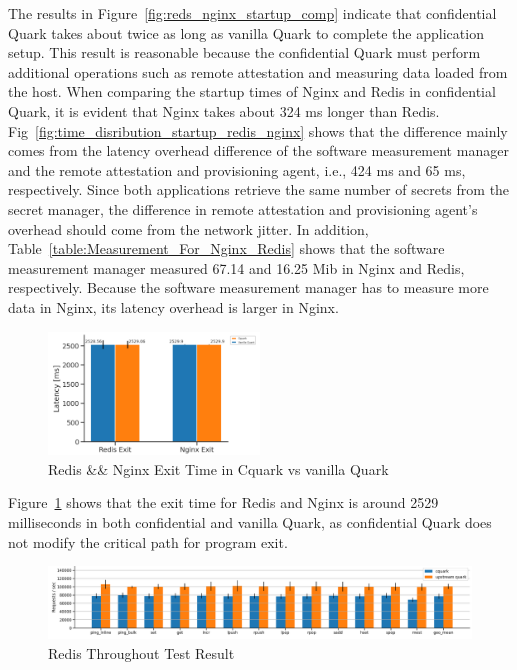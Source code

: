 The results in Figure~\ref{fig:reds_nginx_startup_comp} indicate that confidential Quark takes about twice as long as vanilla Quark to complete the application setup. This result is reasonable because the confidential Quark must perform additional operations such as remote attestation and 
measuring data loaded from the host. When comparing the startup times of Nginx and Redis in confidential Quark, it is evident that Nginx takes about 324 ms longer than Redis. Fig~\ref{fig:time_disribution_startup_redis_nginx} shows that the difference mainly comes from the latency overhead 
difference of the software measurement manager and the remote attestation and provisioning agent, i.e., 424 ms and 65 ms, respectively. Since both applications retrieve the same number of secrets from the secret manager, the difference in remote attestation and provisioning 
agent's overhead should come from the network jitter. In addition, Table~\ref{table:Measurement_For_Nginx_Redis} shows that the software measurement manager measured 67.14 and 16.25 Mib in Nginx and Redis, respectively. Because the software measurement manager has to measure more data in 
Nginx, its latency overhead is larger in Nginx. 

\begin{figure}[!htb]
  \centering
  \includegraphics[width=0.5\textwidth]{images/reds_nginx_exit_comp.PNG}
  \caption[Redis \&\& Nginx Exit Time in Cquark vs vanilla Quark]{Redis \&\& Nginx Exit Time in Cquark vs vanilla Quark}
  \label{fig:reds_nginx_exit_comp}
\end{figure}
Figure~\ref{fig:reds_nginx_exit_comp} shows that the exit time for Redis and Nginx is around 2529 milliseconds in both confidential and vanilla Quark, as confidential Quark does not modify the critical path for program exit.
\begin{figure}[!htb]
  \centering
  \includegraphics[width=1\textwidth]{images/redis_throughput.PNG}
  \caption[Redis Throughout Test]{Redis Throughout Test Result}
  \label{fig:redis_throughput}
\end{figure}



